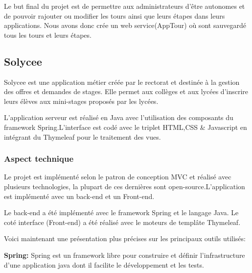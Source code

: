 \documentclass[a4paper]{article}
\begin{document}
Le but final du projet est de permettre aux administrateurs d'être autonomes et de pouvoir rajouter ou modifier les tours ainsi que leurs  étapes dans leurs applications. Nous avons donc crée un web service(AppTour) où sont sauvegardé tous les tours et leurs étapes.

\subsection{Solycee}

Solycee est une application métier créée par le rectorat et destinée à la gestion des offres et demandes de stages. Elle permet aux collèges et aux lycées d'inscrire leurs élèves aux mini-stages proposés par les lycées.  

L'application serveur est réalisé en Java avec l'utilisation des composants du framework Spring.L'interface est codé avec le triplet HTML,CSS \& Javascript en intégrant du Thymeleaf pour le traitement des vues.  

\subsubsection{Aspect technique}

Le projet est implémenté selon le patron de conception MVC et réalisé avec plusieurs technologies, la plupart de ces dernières sont open-source.L'application est implémenté avec un back-end et un Front-end.

Le back-end a été implémenté avec le framework Spring et le langage Java. Le coté interface (Front-end) a été réalisé avec le moteurs de templâte Thymeleaf. 

Voici maintenant une présentation plus précises sur les principaux outils utilisés:

\textbf{Spring:}  Spring est un framework libre pour construire et définir l'infrastructure d'une application java dont il facilite le développement et les tests.
\end{document}
